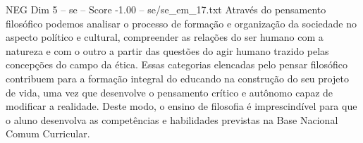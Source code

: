 \begin{textsample}{NEG Dim 5 – se – Score -1.00 – se/se\_em\_17.txt}
Através do pensamento filosófico podemos analisar o processo de formação e organização da sociedade no aspecto político e cultural, compreender as relações do ser humano com a natureza e com o outro a partir das questões do agir humano trazido pelas concepções do campo da ética.
Essas categorias elencadas pelo pensar filosófico contribuem para a formação integral do educando na construção do seu projeto de vida, uma vez que desenvolve o pensamento crítico e autônomo capaz de modificar a realidade.
Deste modo, o ensino de filosofia é imprescindível para que o aluno desenvolva as competências e habilidades previstas na Base Nacional Comum Curricular.

\end{textsample}
